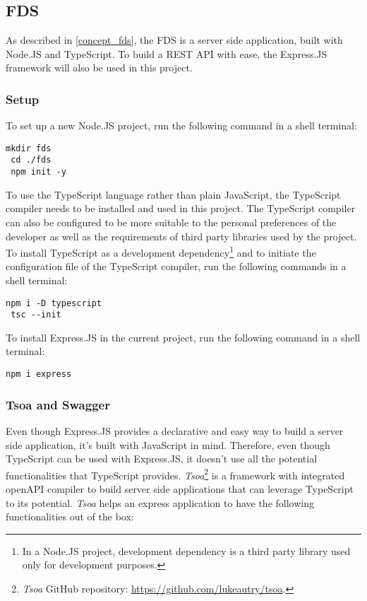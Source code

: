  \subsection{FDS}
 As described in \autoref{concept_fds}, the FDS is a server side application, built with Node.JS and TypeScript. To build a REST API with ease, the Express.JS framework will also be used in this project. 

  \subsubsection{Setup}
  To set up a new Node.JS project, run the following command in a shell terminal:

   \begin{lstlisting}[caption={Creating a new Node.JS program (Shell)}]
 mkdir fds
 cd ./fds
 npm init -y
   \end{lstlisting}
   
  To use the TypeScript language rather than plain JavaScript, the TypeScript compiler needs to be installed and used in this project. The TypeScript compiler can also be configured to be more suitable to the personal preferences of the developer as well as the requirements of third party libraries used by the project. To install TypeScript as a development dependency\footnote{In a Node.JS project, development dependency is a third party library used only for development purposes.} and to initiate the configuration file of the TypeScript compiler, run the following commands in a shell terminal:
  
   \begin{lstlisting}[caption={Installing and configuring TypeScript compiler (Shell)}]
 npm i -D typescript
 tsc --init
   \end{lstlisting}
  
  To install Express.JS in the current project, run the following command in a shell terminal:
  
   \begin{lstlisting}[caption={Installing Express.JS (Shell)}]
 npm i express
   \end{lstlisting}
  
  \subsubsection{Tsoa and Swagger}
  Even though Express.JS provides a declarative and easy way to build a server side application, it's built with JavaScript in mind. Therefore, even though TypeScript can be used with Express.JS, it doesn't use all the potential functionalities that TypeScript provides. \emph{Tsoa}\footnote{\emph{Tsoa} GitHub repository: \url{https://github.com/lukeautry/tsoa}.} is a framework with integrated openAPI compiler to build server side applications that can leverage TypeScript to its potential. \emph{Tsoa} helps an express application to have the following functionalities out of the box:

